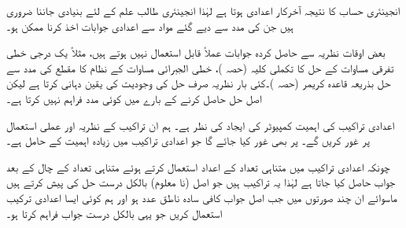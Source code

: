 انجینئری حساب کا نتیجہ آخرکار اعدادی ہوتا ہے لہٰذا انجینئری طالب علم  کے لئے بنیادی  جاننا ضروری ہیں جن کی مدد سے دیے گئے مواد سے اعدادی جوابات اخذ کرنا ممکن ہو۔

بعض اوقات نظریہ سے حاصل کردہ جوابات عملاً قابل استعمال نہیں ہوتے ہیں، مثلاً یک درجی خطی تفرقی مساوات کے حل کا تکملی کلیہ (حصہ )، خطی الجبرائی مساوات کے نظام کا مقطع کی مدد سے حل بذریعہ قاعدہ کریمر (حصہ )۔کئی بار نظریہ صرف حل کی وجودیت کی یقین دہانی کرتا ہے لیکن اصل حل حاصل کرنے کے بارے میں کوئی مدد فراہم نہیں کرتا ہے۔

اعدادی تراکیب کی اہمیت کمپیوٹر کی ایجاد کی نظر ہے۔ ہم ان تراکیب کے نظریہ اور عملی استعمال پر غور کریں گے۔ پر بھی غور کیا جائے گا جو اعدادی تراکیب میں زیادہ اہمیت کے حامل ہے۔     

چونکہ اعدادی تراکیب میں متناہی تعداد کے اعداد استعمال کرتے ہوئے متناہی تعداد کے چال کے بعد جواب حاصل کیا جاتا ہے لہٰذا  یہ تراکیب   ہیں جو اصل (نا معلوم) بالکل درست حل کی  پیش کرتے ہیں ماسوائے ان چند صورتوں میں جب اصل جواب کافی سادہ ناطق عدد ہو اور ہم کوئی ایسا اعدادی ترکیب استعمال کریں جو یہی بالکل درست جواب فراہم کرتا ہو۔

